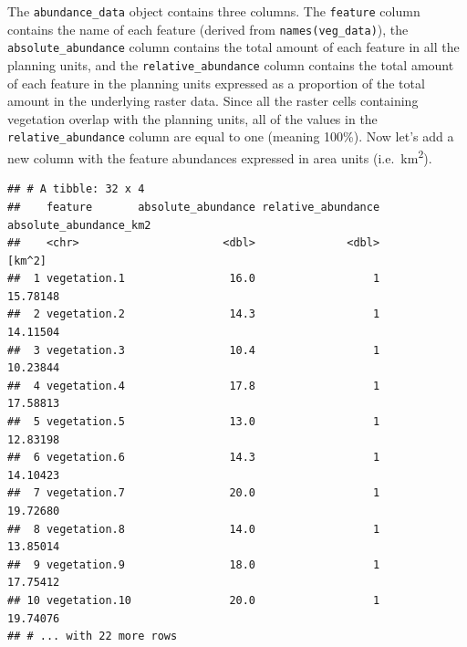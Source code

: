 \documentclass[
  12pt,
]{book}
\newenvironment{Shaded}{\begin{snugshade}}{\end{snugshade}}
\newcommand{\CommentTok}[1]{\textcolor[rgb]{0.56,0.35,0.01}{\textit{#1}}}
\newcommand{\DecValTok}[1]{\textcolor[rgb]{0.00,0.00,0.81}{#1}}
\newcommand{\KeywordTok}[1]{\textcolor[rgb]{0.13,0.29,0.53}{\textbf{#1}}}
\newcommand{\NormalTok}[1]{#1}
\newcommand{\OperatorTok}[1]{\textcolor[rgb]{0.81,0.36,0.00}{\textbf{#1}}}
\newcommand{\StringTok}[1]{\textcolor[rgb]{0.31,0.60,0.02}{#1}}
\begin{document}
The \texttt{abundance\_data} object contains three columns. The \texttt{feature} column contains the name of each feature (derived from \texttt{names(veg\_data)}), the \texttt{absolute\_abundance} column contains the total amount of each feature in all the planning units, and the \texttt{relative\_abundance} column contains the total amount of each feature in the planning units expressed as a proportion of the total amount in the underlying raster data. Since all the raster cells containing vegetation overlap with the planning units, all of the values in the \texttt{relative\_abundance} column are equal to one (meaning 100\%). Now let's add a new column with the feature abundances expressed in area units (i.e.~km\textsuperscript{2}).

\begin{Shaded}
\end{Shaded}

\begin{verbatim}
## # A tibble: 32 x 4
##    feature       absolute_abundance relative_abundance absolute_abundance_km2
##    <chr>                      <dbl>              <dbl>                 [km^2]
##  1 vegetation.1                16.0                  1               15.78148
##  2 vegetation.2                14.3                  1               14.11504
##  3 vegetation.3                10.4                  1               10.23844
##  4 vegetation.4                17.8                  1               17.58813
##  5 vegetation.5                13.0                  1               12.83198
##  6 vegetation.6                14.3                  1               14.10423
##  7 vegetation.7                20.0                  1               19.72680
##  8 vegetation.8                14.0                  1               13.85014
##  9 vegetation.9                18.0                  1               17.75412
## 10 vegetation.10               20.0                  1               19.74076
## # ... with 22 more rows
\end{verbatim}
\end{document}
